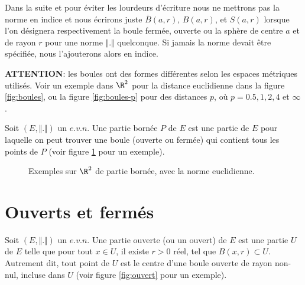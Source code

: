 \documentclass[class=report,crop=false]{standalone}
\begin{document}
\begin{remarque*}
\textcolor[rgb]{0.00,0.00,1.00}{
\noindent Dans la suite et pour éviter les lourdeurs d'écriture nous ne mettrons pas la norme en indice et nous écrirons juste
$\overline{B}(a,r)$, $B(a,r)$, et $S(a,r)$ lorsque l'on désignera  respectivement la boule fermée, ouverte ou la sphère de centre $a$ et de rayon $r$ pour une norme $\Vert . \Vert$ quelconque. Si jamais la norme devait être spécifiée, nous l'ajouterons alors en indice. }
\end{remarque*}


\begin{remarque*}
\textcolor[rgb]{0.00,0.00,1.00}{
\noindent \textbf{ATTENTION}: les boules ont des formes différentes selon les espaces métriques
utilisés. Voir un exemple dans $\R^2$ pour la distance euclidienne dans la figure \ref{fig:boules}, ou la figure \ref{fig:boules-p} pour des distances $p$, où $p=0.5, 1,2, 4$ et $\infty$.}
\end{remarque*}






\begin{definition}
\textcolor[rgb]{0.73,0.00,0.00}{
\noindent Soit $(E,\Vert . \Vert)$ un $e.v.n$. Une partie bornée $P$ de $E$ est une partie de $E$ pour laquelle on
peut trouver une boule (ouverte ou fermée) qui contient tous les points de $P$ (voir figure \ref{fig:bornee} pour un exemple).
}
\end{definition}

 \begin{figure}[!h]
    \caption{Exemples sur $\R^2$ de partie bornée, avec la norme euclidienne.}
      \label{fig:bornee}
\end{figure}


\section{Ouverts et fermés}

\begin{definition}
\textcolor[rgb]{0.73,0.00,0.00}{
\noindent Soit $(E,\Vert . \Vert)$ un $e.v.n$. Une partie ouverte (ou un ouvert) de $E$ est une partie $U$ de $E$
telle que pour tout $x \in U$, il existe $r >0$ réel, tel que $B(x,r) \subset U$. Autrement dit, 
tout point de $U$ est le centre d'une boule ouverte de rayon non-nul, incluse dans $U$ (voir figure \ref{fig:ouvert} pour un exemple).
}
\end{definition}
\end{document}
